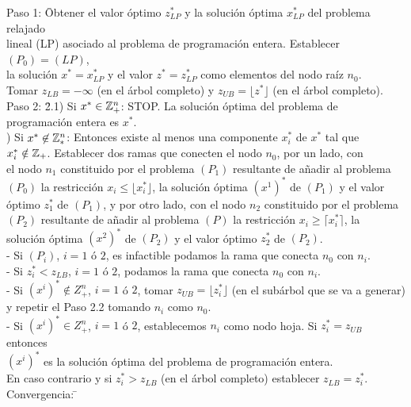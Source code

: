 \documentclass[PM.tex]{subfiles}
\begin{document}
\begin{tabbing}


Paso 1: \= Obtener el valor óptimo $z_{LP}^*$ y la solución óptima $x_{LP}^*$ del problema relajado\\ \> lineal (LP) asociado al problema de programación entera. Establecer $(P_0)=(LP)$,\\ \> la solución $x^*=x^*_{LP}$ y el valor $z^*=z^*_{LP}$ como elementos del nodo raíz $n_0$.\\ \> Tomar $z_{LB}=-\infty$ (en el árbol completo) y $z_{UB}=\lfloor z^*\rfloor$ (en el árbol completo).\\

Paso 2: \= 2.1) Si $x^*\in\mathbb{Z}_+^n$: STOP. La solución óptima del problema de programación entera es $x^*$. \\ ) Si $x^*\not\in\mathbb{Z}_*^n$: Entonces existe al menos una componente $x^*_i$ de $x^*$ tal que\\ \> $x^*_i\notin\mathbb{Z}_+$. Establecer dos ramas que conecten el nodo $n_0$, por un lado, con\\ \> el nodo $n_1$ constituido por el problema $(P_1)$ resultante de añadir al problema\\ \> $(P_0)$ la restricción $x_i\leq\lfloor x^*_i\rfloor$, la solución óptima $(x^1)^*$ de $(P_1)$ y el valor\\ \> óptimo $z^*_1$ de $(P_1)$, y por otro lado, con el nodo $n_2$ constituido por el problema\\ \> $(P_2)$ resultante de añadir al problema $(P)$ la restricción $x_i\geq\lceil x^*_i\rceil$, la\\ \> solución óptima $(x^2)^*$ de $(P_2)$ y el valor óptimo $z^*_2$ de $(P_2)$. \\ \>
- Si $(P_i)$, $i=1$ ó $2$, es infactible podamos la rama que conecta $n_0$ con $n_i$.\\ \>
- Si $z^*_i<z_{LB}$, $i=1$ ó $2$, podamos la rama que conecta $n_0$ con $n_i$.\\ \>
- Si $(x^i)^*\notin Z^n_+$, $i=1$ ó $2$, tomar $z_{UB}=\lfloor z^*_i\rfloor$ (en el subárbol que se va a generar)\\ \> y repetir el Paso 2.2 tomando $n_i$ como $n_0$. \\ \>
- Si $(x^i)^*\in Z^n_+$, $i=1$ ó $2$, establecemos $n_i$ como nodo hoja. Si $z_i^*=z_{UB}$ entonces\\ \> $(x^i)^*$ es la solución óptima del problema de programación entera.\\ \> En caso contrario y si $z^*_i>z_{LB}$ (en el árbol completo) establecer $z_{LB}=z_i^*$.\\
Convergencia: \=
\end{tabbing}
\end{document}

